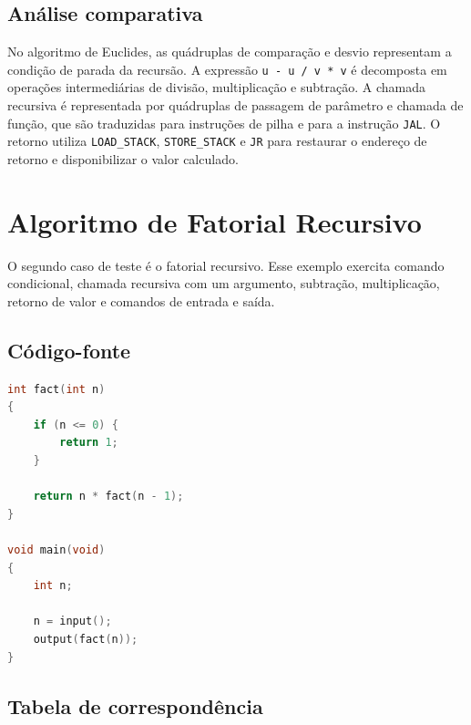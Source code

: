\subsection{Análise comparativa}

No algoritmo de Euclides, as quádruplas de comparação e desvio representam a condição de parada da recursão. A expressão \texttt{u - u / v * v} é decomposta em operações intermediárias de divisão, multiplicação e subtração. A chamada recursiva é representada por quádruplas de passagem de parâmetro e chamada de função, que são traduzidas para instruções de pilha e para a instrução \texttt{JAL}. O retorno utiliza \texttt{LOAD\_STACK}, \texttt{STORE\_STACK} e \texttt{JR} para restaurar o endereço de retorno e disponibilizar o valor calculado.

\newpage
\section{Algoritmo de Fatorial Recursivo}
\label{sec:res_fact}

O segundo caso de teste é o fatorial recursivo. Esse exemplo exercita comando condicional, chamada recursiva com um argumento, subtração, multiplicação, retorno de valor e comandos de entrada e saída.

\subsection{Código-fonte}

\begin{lstlisting}[language=C, caption={Código-fonte do algoritmo de fatorial recursivo.}, label={lst:fact_fonte}]
int fact(int n)
{
    if (n <= 0) {
        return 1;
    }

    return n * fact(n - 1);
}

void main(void)
{
    int n;

    n = input();
    output(fact(n));
}
\end{lstlisting}

\subsection{Tabela de correspondência}

